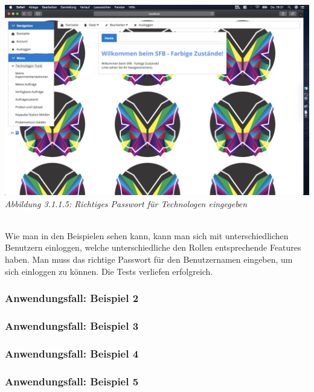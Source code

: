 \documentclass[enabledeprecatedfontcommands,fontsize=12pt,paper=a4,twoside]{scrartcl}
\begin{document}
\hypertarget{sc3.1.1.5}{
\includegraphics[width=1\textwidth]{Screenshots/311TechnologeView.png}
\textit{Abbildung 3.1.1.5: Richtiges Passwort für Technologen eingegeben}
} \\

Wie man in den Beispielen sehen kann, kann man sich mit unterschiedlichen Benutzern einloggen, welche unterschiedliche den Rollen entsprechende Features haben. Man muss das richtige Passwort für den Benutzernamen eingeben, um sich einloggen zu können. Die Tests verliefen erfolgreich. \\


\subsubsection{Anwendungsfall: Beispiel 2}


\subsubsection{Anwendungsfall: Beispiel 3}


\subsubsection{Anwendungsfall: Beispiel 4}


\subsubsection{Anwendungsfall: Beispiel 5}

\end{document}
